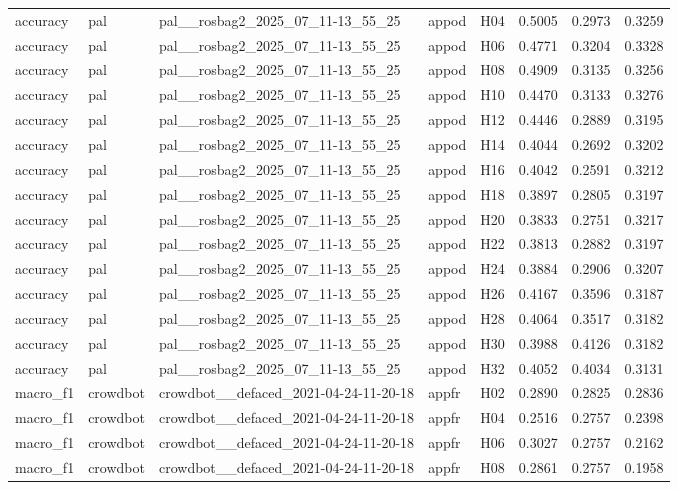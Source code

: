 \begin{table}[tbp]
\begin{tabular}{lllllrrr}
accuracy & pal & pal\_\_rosbag2\_2025\_07\_11-13\_55\_25 & appod & H04 & 0.5005 & 0.2973 & 0.3259 \\
accuracy & pal & pal\_\_rosbag2\_2025\_07\_11-13\_55\_25 & appod & H06 & 0.4771 & 0.3204 & 0.3328 \\
accuracy & pal & pal\_\_rosbag2\_2025\_07\_11-13\_55\_25 & appod & H08 & 0.4909 & 0.3135 & 0.3256 \\
accuracy & pal & pal\_\_rosbag2\_2025\_07\_11-13\_55\_25 & appod & H10 & 0.4470 & 0.3133 & 0.3276 \\
accuracy & pal & pal\_\_rosbag2\_2025\_07\_11-13\_55\_25 & appod & H12 & 0.4446 & 0.2889 & 0.3195 \\
accuracy & pal & pal\_\_rosbag2\_2025\_07\_11-13\_55\_25 & appod & H14 & 0.4044 & 0.2692 & 0.3202 \\
accuracy & pal & pal\_\_rosbag2\_2025\_07\_11-13\_55\_25 & appod & H16 & 0.4042 & 0.2591 & 0.3212 \\
accuracy & pal & pal\_\_rosbag2\_2025\_07\_11-13\_55\_25 & appod & H18 & 0.3897 & 0.2805 & 0.3197 \\
accuracy & pal & pal\_\_rosbag2\_2025\_07\_11-13\_55\_25 & appod & H20 & 0.3833 & 0.2751 & 0.3217 \\
accuracy & pal & pal\_\_rosbag2\_2025\_07\_11-13\_55\_25 & appod & H22 & 0.3813 & 0.2882 & 0.3197 \\
accuracy & pal & pal\_\_rosbag2\_2025\_07\_11-13\_55\_25 & appod & H24 & 0.3884 & 0.2906 & 0.3207 \\
accuracy & pal & pal\_\_rosbag2\_2025\_07\_11-13\_55\_25 & appod & H26 & 0.4167 & 0.3596 & 0.3187 \\
accuracy & pal & pal\_\_rosbag2\_2025\_07\_11-13\_55\_25 & appod & H28 & 0.4064 & 0.3517 & 0.3182 \\
accuracy & pal & pal\_\_rosbag2\_2025\_07\_11-13\_55\_25 & appod & H30 & 0.3988 & 0.4126 & 0.3182 \\
accuracy & pal & pal\_\_rosbag2\_2025\_07\_11-13\_55\_25 & appod & H32 & 0.4052 & 0.4034 & 0.3131 \\
macro\_f1 & crowdbot & crowdbot\_\_defaced\_2021-04-24-11-20-18 & appfr & H02 & 0.2890 & 0.2825 & 0.2836 \\
macro\_f1 & crowdbot & crowdbot\_\_defaced\_2021-04-24-11-20-18 & appfr & H04 & 0.2516 & 0.2757 & 0.2398 \\
macro\_f1 & crowdbot & crowdbot\_\_defaced\_2021-04-24-11-20-18 & appfr & H06 & 0.3027 & 0.2757 & 0.2162 \\
macro\_f1 & crowdbot & crowdbot\_\_defaced\_2021-04-24-11-20-18 & appfr & H08 & 0.2861 & 0.2757 & 0.1958 \\

\end{tabular}
\end{table}

